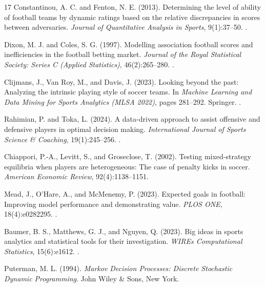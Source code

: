 \documentclass[11pt]{article}
\theoremstyle{plain}
\theoremstyle{definition}
\theoremstyle{remark}
\begin{document}
\begin{thebibliography}{17}
Constantinou, A. C. and Fenton, N. E. (2013).
\newblock Determining the level of ability of football teams by dynamic ratings based on the relative discrepancies in scores between adversaries.
\newblock \emph{Journal of Quantitative Analysis in Sports}, 9(1):37--50.
\newblock {}.

Dixon, M. J. and Coles, S. G. (1997).
\newblock Modelling association football scores and inefficiencies in the football betting market.
\newblock \emph{Journal of the Royal Statistical Society: Series C (Applied Statistics)}, 46(2):265--280.
\newblock {}.

Clijmans, J., Van Roy, M., and Davis, J. (2023).
\newblock Looking beyond the past: Analyzing the intrinsic playing style of soccer teams.
\newblock In \emph{Machine Learning and Data Mining for Sports Analytics (MLSA 2022)}, pages 281--292. Springer.
\newblock {}.

Rahimian, P. and Toka, L. (2024).
\newblock A data-driven approach to assist offensive and defensive players in optimal decision making.
\newblock \emph{International Journal of Sports Science \& Coaching}, 19(1):245--256.
\newblock {}.

Chiappori, P.-A., Levitt, S., and Groseclose, T. (2002).
\newblock Testing mixed-strategy equilibria when players are heterogeneous: The case of penalty kicks in soccer.
\newblock \emph{American Economic Review}, 92(4):1138--1151.

Mead, J., O'Hare, A., and McMenemy, P. (2023).
\newblock Expected goals in football: Improving model performance and demonstrating value.
\newblock \emph{PLOS ONE}, 18(4):e0282295.
\newblock {}.

Baumer, B. S., Matthews, G. J., and Nguyen, Q. (2023).
\newblock Big ideas in sports analytics and statistical tools for their investigation.
\newblock \emph{WIREs Computational Statistics}, 15(6):e1612.
\newblock {}.

Puterman, M. L. (1994).
\newblock \emph{Markov Decision Processes: Discrete Stochastic Dynamic Programming}.
\newblock John Wiley \& Sons, New York.


\end{thebibliography}
\end{document}
